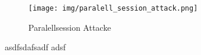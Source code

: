 \documentclass[12pt]{scrartcl}
\begin{document}
\begin{figure}
    \centering
    \texttt{[image: img/paralell\_session\_attack.png]}
    \caption{Paralellsession Attacke}
    \label{fig:paralell_session_attack}
\end{figure}

asdfsdafsadf
adsf










\end{document}
